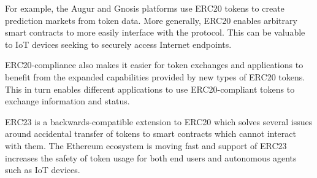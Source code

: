 For example, the Augur and Gnosis platforms use ERC20 tokens to create prediction markets from token data. More generally, ERC20 enables arbitrary smart contracts to more easily interface with the \orchid{} protocol. This can be valuable to IoT devices seeking to securely access Internet endpoints.

ERC20-compliance also makes it easier for token exchanges and applications to benefit from the expanded capabilities provided by new types of ERC20 tokens. This in turn enables different applications to use ERC20-compliant tokens to exchange information and status.

ERC23\cite{41} is a backwards-compatible extension to ERC20 which solves several issues around accidental transfer of tokens to smart contracts which cannot interact with them. The Ethereum ecosystem is moving fast and support of ERC23 increases the safety of \orchid{} token usage for both end users and autonomous agents such as IoT devices.
